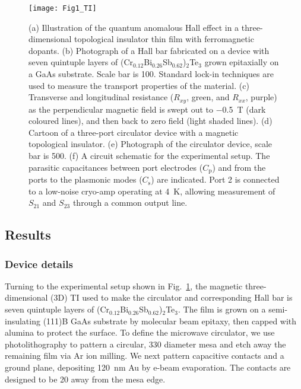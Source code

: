 \begin{figure}
\texttt{[image: Fig1\_TI]}
\caption[A three-dimensional topological insulator based circulator]{\label{fig:fig1_ti}(a) Illustration of the quantum anomalous Hall effect in a three-dimensional topological insulator thin film with ferromagnetic dopants. (b) Photograph of a Hall bar fabricated on a device with seven quintuple layers of (Cr$_{0.12}$Bi$_{0.26}$Sb$_{0.62}$)$_2$Te$_3$ grown epitaxially on a GaAs substrate. Scale bar is \SI{100}{\micron}. Standard lock-in techniques are used to measure the transport properties of the material. (c) Transverse and longitudinal resistance ($R_{xy}$, green, and $R_{xx}$, purple) as the perpendicular magnetic field is swept out to \SI{-0.5}{\tesla} (dark coloured lines), and then back to zero field (light shaded lines). (d) Cartoon of a three-port circulator device with a magnetic topological insulator.  (e) Photograph of the circulator device, scale bar is \SI{500}{\micron}. (f) A circuit schematic for the experimental setup. The parasitic capacitances between port electrodes ($C_\textrm{p}$) and from the ports to the plasmonic modes ($C_\textrm{s}$) are indicated. Port 2 is connected to a low-noise cryo-amp operating at \SI{4}{\kelvin}, allowing measurement of $S_{21}$ and $S_{23}$ through a common output line.}
\end{figure} 

\subsection{Results}
\subsubsection{Device details} Turning to the experimental setup shown in Fig.~\ref{fig:fig1_ti}, the magnetic three-dimensional (3D) TI used to make the circulator and corresponding Hall bar is seven quintuple layers of (Cr$_{0.12}$Bi$_{0.26}$Sb$_{0.62}$)$_2$Te$_3$. The film is grown on a semi-insulating (111)B GaAs substrate by molecular beam epitaxy, then capped with alumina to protect the surface. To define the microwave circulator, we use photolithography to pattern a circular, \SI{330}{\micron} diameter mesa and etch away the remaining film via Ar ion milling. We next pattern capacitive contacts and a ground plane, depositing \SI{120}{\nano\meter} Au by e-beam evaporation. The contacts are designed to be \SI{20}{\micron} away from the mesa edge.

